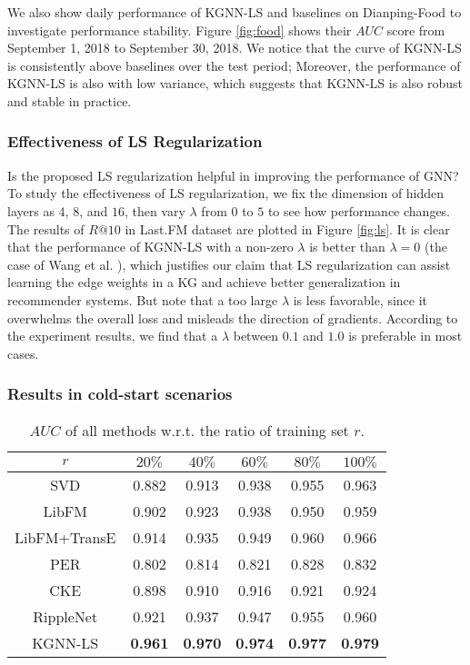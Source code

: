 \documentclass[sigconf]{acmart}
\begin{document}
			We also show daily performance of KGNN-LS and baselines on Dianping-Food to investigate performance stability.
			Figure \ref{fig:food} shows their $AUC$ score from September 1, 2018 to September 30, 2018.
			We notice that the curve of KGNN-LS is consistently above baselines over the test period;
			Moreover, the performance of KGNN-LS is also with low variance, which suggests that KGNN-LS is also robust and stable in practice.
			
			
		\subsubsection{Effectiveness of LS Regularization}
			Is the proposed LS regularization helpful in improving the performance of GNN?
			To study the effectiveness of LS regularization, we fix the dimension of hidden layers as $4$, $8$, and $16$, then vary $\lambda$ from $0$ to $5$ to see how performance changes.
			The results of $R@10$ in Last.FM dataset are plotted in Figure \ref{fig:ls}.
			It is clear that the performance of KGNN-LS with a non-zero $\lambda$ is better than $\lambda=0$ (the case of Wang et al. \cite{wang2019knowledge}), which justifies our claim that LS regularization can assist learning the edge weights in a KG and achieve better generalization in recommender systems.
			But note that a too large $\lambda$ is less favorable, since it overwhelms the overall loss and misleads the direction of gradients.
			According to the experiment results, we find that a $\lambda$ between $0.1$ and $1.0$ is preferable in most cases.
			
			
		\subsubsection{Results in cold-start scenarios}
			\begin{table}[t]
				\centering
				\setlength{\tabcolsep}{6pt}
				\begin{tabular}{c|ccccc}
					\hline
					$r$ & $20\%$ & $40\%$ & $60\%$ & $80\%$ & $100\%$ \\
					\hline
					SVD & 0.882 & 0.913 & 0.938 & 0.955 & 0.963 \\
					LibFM & 0.902 & 0.923 & 0.938 & 0.950 & 0.959 \\
					LibFM+TransE & 0.914 & 0.935 & 0.949 & 0.960 & 0.966 \\
					PER & 0.802 & 0.814 & 0.821 & 0.828 & 0.832 \\
					CKE & 0.898 & 0.910 & 0.916 & 0.921 & 0.924 \\
					RippleNet & 0.921 & 0.937 & 0.947 & 0.955 & 0.960 \\
					KGNN-LS & \textbf{0.961} & \textbf{0.970} & \textbf{0.974} & \textbf{0.977} & \textbf{0.979} \\
					\hline
				\end{tabular}
				\vspace{0.05in}
				\caption{$AUC$ of all methods w.r.t. the ratio of training set $r$.}
				\label{table:sparse}
				\vspace{-0.2in}
			\end{table}
		
\end{document}
